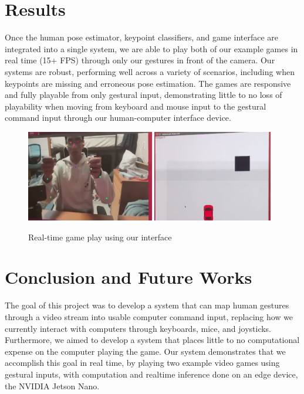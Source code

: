 \documentclass[10pt,twocolumn,letterpaper]{article}
\begin{document}
\section{Results}
Once the human pose estimator, keypoint classifiers, and game interface are integrated into 
a single system, we are able to play both of our example games in real time (15+ FPS) through only our 
gestures in front of the camera. Our systems are robust, performing well across a variety of scenarios, 
including when keypoints are missing and erroneous pose estimation. The games are responsive and 
fully playable from only gestural input, demonstrating little to no loss of playability when 
moving from keyboard and mouse input to the gestural command input through our human-computer 
interface device.\\
\begin{figure}[h]
    \centering
    \includegraphics[width = .5\linewidth,height=4cm]{images/user.png}\hfill
    \includegraphics[width = .5\linewidth,height=4cm]{images/game.png}
    \caption{Real-time game play using our interface}
\end{figure}
\section{Conclusion and Future Works}
The goal of this project was to develop a system that can map human gestures through a video 
stream into usable computer command input, replacing how we currently interact with computers 
through keyboards, mice, and joysticks. Furthermore, we aimed to develop a system that 
places little to no computational expense on the computer playing the game. 
Our system demonstrates that we accomplish this goal 
in real time, by playing two example video games using gestural inputs, with computation 
and realtime inference done on an edge device, the NVIDIA Jetson Nano.\\
\end{document}
